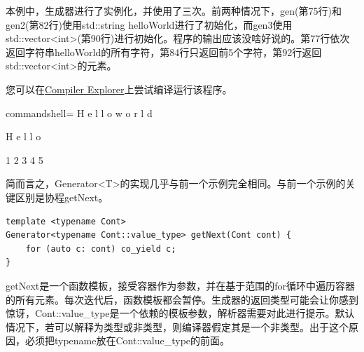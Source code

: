 本例中，生成器进行了实例化，并使用了三次。前两种情况下，gen(第75行)和gen2(第82行)使用std::string helloWorld进行了初始化，而gen3使用std::vector<int>(第90行)进行初始化。程序的输出应该没啥好说的。第77行依次返回字符串helloWorld的所有字符，第84行只返回前5个字符，第92行返回std::vector<int>的元素。

您可以在\href{https://godbolt.org/z/j9znva}{Compiler Explorer}上尝试编译运行该程序。

\begin{tcblisting}{commandshell={}}
H e l l o  w o r l d

H e l l o

1 2 3 4 5
\end{tcblisting}

简而言之，Generator<T>的实现几乎与前一个示例完全相同。与前一个示例的关键区别是协程getNext。

\begin{lstlisting}[style=styleCXX]
template <typename Cont>
Generator<typename Cont::value_type> getNext(Cont cont) {
	for (auto c: cont) co_yield c;
}
\end{lstlisting}

getNext是一个函数模板，接受容器作为参数，并在基于范围的for循环中遍历容器的所有元素。每次迭代后，函数模板都会暂停。生成器的返回类型可能会让你感到惊讶，Cont::value\_type是一个依赖的模板参数，解析器需要对此进行提示。默认情况下，若可以解释为类型或非类型，则编译器假定其是一个非类型。出于这个原因，必须把typename放在Cont::value\_type的前面。


\newpage












